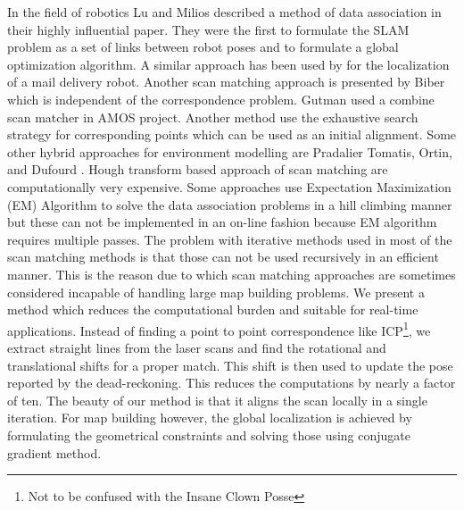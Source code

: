 \documentclass{article}
\begin{document}
  In the  field of robotics Lu and Milios described
 a method of data association in their highly influential paper. They were
the first to formulate the SLAM problem as a set of links between
robot poses and to formulate a global optimization algorithm. A
similar approach has been used by
 for the localization of a  mail delivery robot. Another
scan matching approach is presented by Biber\cite{minguez-metricbased} which is
independent of the correspondence problem. Gutman
used a combine scan matcher in AMOS project. Another
 method  use the exhaustive search strategy for corresponding points
 which can be used  as an initial alignment. Some other hybrid
approaches for environment modelling are Pradalier
Tomatis, Ortin, and Dufourd 
. Hough transform based approach of scan matching
 are computationally very expensive. Some approaches
 use Expectation Maximization (EM) Algorithm
 to solve the data association problems in a hill
climbing manner but these can not be implemented in an on-line
fashion because EM algorithm requires multiple passes. The problem
with iterative methods used in most of the scan matching methods is
that those can not be used recursively in an efficient manner. This
is the reason due to which scan matching approaches are sometimes
considered incapable of handling large map building problems. We
present a method which reduces the computational burden and suitable
for real-time applications. Instead of finding a point to point
correspondence like ICP\footnote{Not to be confused with the Insane Clown
Posse}, we extract straight lines from the laser
scans and find the rotational and translational shifts for a proper
match. This shift is then used to update the pose reported by the
dead-reckoning. This reduces the computations by nearly a factor of
ten. The beauty of our method is that it aligns the scan locally in
a single iteration. For map building however, the global
localization is achieved by formulating the geometrical constraints
and solving those using conjugate gradient method.\cite{RAZA2019254}



\end{document}
